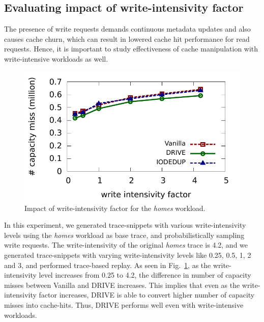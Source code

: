 \subsection{Evaluating impact of write-intensivity factor}
The presence of write requests
demands continuous metadata updates and also causes cache churn, which
can result in lowered cache hit performance for read requests. Hence, 
it is important to study effectiveness of cache manipulation with
write-intensive workloads as well. 

\begin{figure}[h]
\centering
\includegraphics[scale=0.78]{confided-figures/write-intensivity-factor/reads-writes/homes-wif.pdf}
\caption{Impact of write-intensivity factor for the \textit{homes} workload.}
\label{fig:wif-impact}
\end{figure}

In this experiment, we generated trace-snippets with various 
write-intensivity
levels using the \textit{homes} workload as base trace, and
probabilistically sampling write requests. The write-intensivity of the
original \textit{homes} trace is 4.2, and we generated trace-snippets
with varying write-intensivity levels like 0.25, 0.5, 1, 2 and 3, and
performed trace-based replay. 
As seen in Fig.~\ref{fig:wif-impact}, as the write-intensivity level
increases from 0.25 to 4.2, the difference in
number of capacity misses between Vanilla and DRIVE increases. 
This implies that even as the write-intensivity factor increases, DRIVE is 
able to convert higher number of capacity misses into cache-hits. 
Thus, DRIVE performs well even with write-intensive workloads.

